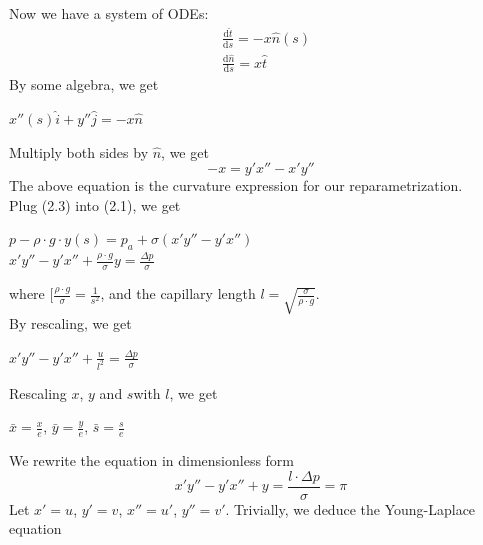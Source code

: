 \documentclass{jfm}
\begin{document}
        Now we have a system of ODEs:\\
        \begin{equation}
        \begin{aligned}
        &\frac{\mathrm{d}\hat{t}}{\mathrm{d}s}=-x\hat{n}(s)\\
        &\frac{\mathrm{d}\hat{n}}{\mathrm{d}s}=x\hat{t}
        \end{aligned}
        \end{equation}
        By some algebra, we get\\
        \begin{center}
        $x''(s)\hat{i}+y''\hat{j}=-x\hat{n}$
        \end{center}
        Multiply both sides by $\hat{n}$, we get\\
        \begin{equation}
        -x=y'x''-x'y''
        \end{equation}
        The above equation is the curvature expression for our reparametrization.\\
        Plug (2.3) into (2.1), we get\\
        \begin{center}
        $p-\rho\cdot{g}\cdot{y(s)}=p_{a}+\sigma(x'y''-y'x'')$\\
        $x'y''-y'x''+\frac{\rho\cdot{g}}{\sigma}y=\frac{\Delta{p}}{\sigma}$
        \end{center}
        where $[\frac{\rho\cdot{g}}{\sigma}=\frac{1}{s^2}$, and the capillary length $l=\sqrt{\frac{\sigma}{\rho\cdot{g}}}$.\\
        By rescaling, we get\\
        \begin{center}
        $x'y''-y'x''+\frac{u}{l^2}=\frac{\Delta{p}}{\sigma}$
        \end{center}
        Rescaling $x$, $y$ and $s$with $l$, we get\\
        \begin{center}
        $\bar{x}=\frac{x}{e}$, $\bar{y}=\frac{y}{e}$, $\bar{s}=\frac{s}{e}$
        \end{center}
        We rewrite the equation in dimensionless form\\
        \begin{equation}
        x'y''-y'x''+y=\frac{l\cdot{\Delta{p}}}{\sigma}=\pi
        \end{equation}
        Let $x'=u$, $y'=v$, $x''=u'$, $y''=v'$. Trivially, we deduce the Young-Laplace equation\\
\end{document}
